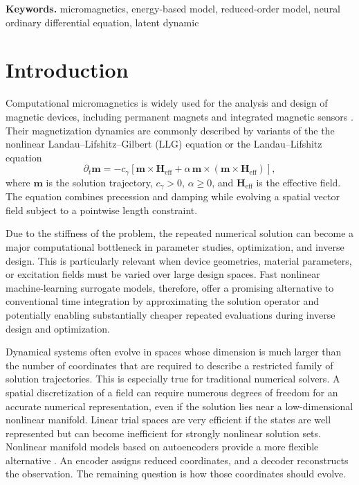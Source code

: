 \documentclass[a4paper,11pt]{article}
\newcommand{\m}{\bm m}
\begin{document}
\textbf{Keywords.} micromagnetics, energy-based model, reduced-order model, neural ordinary differential equation, latent dynamic

\section{Introduction}
Computational micromagnetics is widely used for the analysis and design of magnetic devices, including permanent magnets and integrated magnetic sensors \cite{brown1963micromagnetics,suess2018topologically,bashir2012head,fischbacher2018micromagnetics,kovacs2020computational}.
Their magnetization dynamics are commonly described by variants of the the nonlinear Landau--Lifshitz--Gilbert (LLG) equation \cite{gilbert2004phenomenological} or the Landau--Lifshitz equation
\begin{equation}
 \partial_t\m=-c_\gamma[\m\times\bm H_{\mathrm{eff}}+\alpha\,\m\times(\m\times\bm H_{\mathrm{eff}})],
 \label{eq:llg}
\end{equation}
where $\m$ is the solution trajectory, $c_\gamma>0$, $\alpha\geq0$, and $\bm H_{\mathrm{eff}}$ is the effective field. The equation combines precession and damping while evolving a spatial vector field subject to a pointwise length constraint.

Due to the stiffness of the problem, the repeated numerical solution can become a major computational bottleneck in parameter studies, optimization, and inverse design. 
This is particularly relevant when device geometries, material parameters, or excitation fields must be varied over large design spaces. 
Fast nonlinear machine-learning surrogate models, therefore, offer a promising alternative to conventional time integration by approximating the solution operator and potentially enabling substantially cheaper repeated evaluations during inverse design and optimization.

Dynamical systems often evolve in spaces whose dimension is much larger than the number of coordinates that are required to describe a restricted family of solution trajectories. This is especially true for traditional numerical solvers. A spatial discretization of a field can require numerous degrees of freedom for an accurate numerical representation, even if the solution lies near a low-dimensional nonlinear manifold. Linear trial spaces are very efficient if the states are well represented but can become inefficient for strongly nonlinear solution sets. Nonlinear manifold models based on autoencoders provide a more flexible alternative \cite{lee2020model,champion2019data}. An encoder assigns reduced coordinates, and a decoder reconstructs the observation. The remaining question is how those coordinates should evolve.
\end{document}
